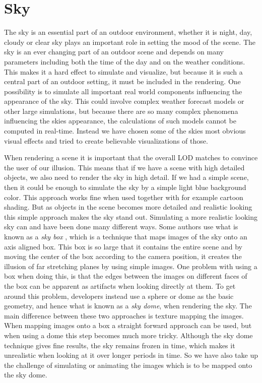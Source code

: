 
\chapter{Sky}
The sky is an essential part of an outdoor environment, whether it is
night, day, cloudy or clear sky plays an important role in setting the
mood of the scene. 
The sky is an ever changing part of an outdoor scene
and depends on many parameters including both the time of the day and
on the weather conditions.
%
This makes it a hard effect to simulate and visualize, but because it
is such a central part of an outdoor setting, it must be included in
the rendering.
%
One possibility is to simulate all important real world components
influencing the appearance of the sky. This could involve complex
weather forecast models or other large simulations, but because there
are so many complex phenomena influencing the skies appearance, the
calculations of such models cannot be computed in real-time. Instead
we have chosen some of the skies most obvious visual effects and tried
to create believable visualizations of those.

When rendering a scene it is important that the overall LOD
matches to convince the user of our illusion. This means that if we
have a scene with high detailed objects, we also need to render the
sky in high detail. If we had a simple scene, then it could be enough to
simulate the sky by a simple light blue background color. This
approach works fine when used together with for example cartoon
shading. But as objects in the scene becomes more detailed and
realistic looking this simple approach makes the sky stand out. 
%
Simulating a more realistic looking sky can and have been done many
different ways. Some authors use what is known as a \emph{sky box}
, which is a technique that maps images
of the sky onto an axis aligned box. This box is so large that it
contains the entire scene and by moving the center of the box
according to the camera position, it  creates the illusion of far
stretching planes by using simple images.
%
One problem with using a box when doing this, is that the edges
between the images on different faces of the box can be apparent as
artifacts when looking directly at them. To get around this problem,
developers instead use a sphere or dome as the basic geometry, and
hence what is known as a \emph{sky dome}, when rendering the sky. The
main difference between these two approaches is texture mapping
the images. When mapping images onto a box a straight forward approach
can be used, but when using a dome this step becomes much more tricky.
%
Although the sky dome technique gives fine results, the sky remains
frozen in time, which makes it unrealistic when looking at it over
longer periods in time. 
%
So we have also take up the challenge of simulating or animating the
images which is to be mapped onto the sky dome.

